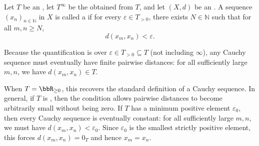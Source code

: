 \begin{definition} \label{definition:cauchy_sequence_in_an_extended_metric_space}
    Let $T$ be an , let $T^\infty$ be the  obtained from $T$, and let $(X, d)$ be an .
    A sequence $(x_n)_{n \in \mathbb{N}}$ in $X$ is called a  if for every $\varepsilon \in T_{>0}$, there exists $N \in \mathbb{N}$ such that for all $m, n \geq N$,
    $$d(x_m, x_n) < \varepsilon.$$

    Because the quantification is over $\varepsilon \in T_{>0} \subseteq T$ (not including $\infty$), any Cauchy sequence must eventually have finite pairwise distances: for all sufficiently large $m,n$, we have $d(x_m,x_n) \in T$.

    When $T = \bbR_{\geq 0}$, this recovers the standard definition of a Cauchy sequence. In general, if $T$ is , then the condition allows pairwise distances to become arbitrarily small without being zero. If $T$ has a minimum positive element $\varepsilon_0$, then every Cauchy sequence is eventually constant: for all sufficiently large $m,n$, we must have $d(x_m,x_n) < \varepsilon_0$. Since $\varepsilon_0$ is the smallest strictly positive element, this forces $d(x_m,x_n) = 0_T$ and hence $x_m = x_n$.
\end{definition}
